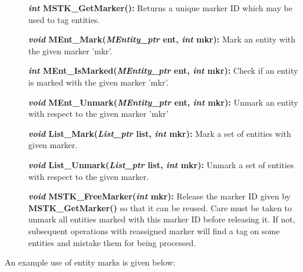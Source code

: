 \documentclass[12pt]{article}
\begin{document}
\begin{description}
\item[]{\bf {\em int} MSTK\_GetMarker():} Returns a unique marker ID
which may be used to tag entities.

\item[]{\bf {\em void} MEnt\_Mark({\em MEntity\_ptr} ent, {\em int} mkr):} Mark an entity with the given marker 'mkr'.

\item[]{\bf {\em int} MEnt\_IsMarked({\em MEntity\_ptr} ent, {\em int} mkr):} Check if an entity is marked with the given marker 'mkr'.

\item[]{\bf {\em void} MEnt\_Unmark({\em MEntity\_ptr} ent, {\em int} mkr):} Unmark an entity with respect to the given marker 'mkr'

\item[]{\bf {\em void} List\_Mark({\em List\_ptr} list, {\em int} mkr):} Mark a set of entities with given marker.

\item[]{\bf {\em void} List\_Unmark({\em List\_ptr} list, {\em int} mkr):}
Unmark a set of entities with respect to the given marker.

\item[]{\bf {\em void} MSTK\_FreeMarker({\em int} mkr):} Release the
marker ID given by {\bf MSTK\_GetMarker()} so that it can be
reused. Care must be taken to unmark all entities marked with this
marker ID before releasing it. If not, subsequent operations with
reassigned marker will find a tag on some entities and mistake them
for being processed.
\end{description}

An example use of entity marks is given below:
\end{document}
